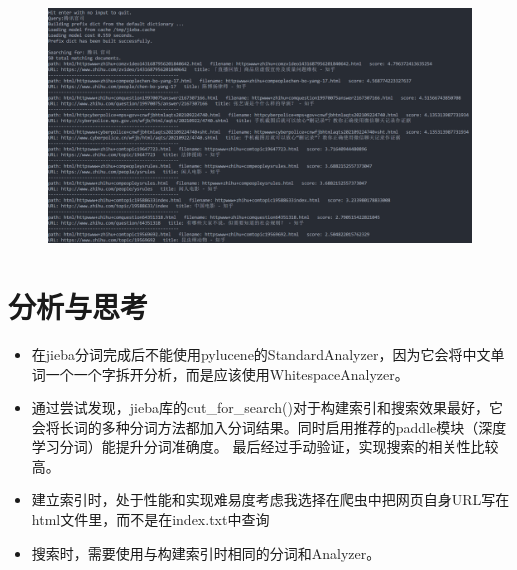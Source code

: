 \documentclass[12pt,a4paper]{article}
\begin{document}
\begin{figure}[H]
	\includegraphics[width=\textwidth]{query7.png}
	\centering
\end{figure}

\section{分析与思考}
\begin{itemize}
	\item 在jieba分词完成后不能使用pylucene的StandardAnalyzer，因为它会将中文单词一个一个字拆开分析，而是应该使用WhitespaceAnalyzer。
	\item 通过尝试发现，jieba库的cut{\_}for{\_}search()对于构建索引和搜索效果最好，它会将长词的多种分词方法都加入分词结果。同时启用推荐的paddle模块（深度学习分词）能提升分词准确度。 最后经过手动验证，实现搜索的相关性比较高。
	\item 建立索引时，处于性能和实现难易度考虑我选择在爬虫中把网页自身URL写在html文件里，而不是在index.txt中查询
	\item 搜索时，需要使用与构建索引时相同的分词和Analyzer。
\end{itemize}
\end{document}
